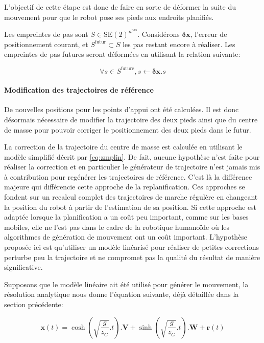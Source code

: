 L'objectif de cette étape est donc de faire en sorte de déformer la
suite du mouvement pour que le robot pose ses pieds aux endroits
planifiés.

Les empreintes de pas sont \mbox{$S \in
  \text{SE}(2)^{n^\text{pas}}$}. Considérons $\mathbf{\delta {x}}$,
l'erreur de positionnement courant, et \mbox{$S^{\text{futur}} \subset
  S$} les pas restant encore à réaliser. Les empreintes de pas futures
seront déformées en utilisant la relation suivante:

\begin{equation}\label{eq:footstepmodif}
  \forall s \in S^{\text{future}}, s \gets \mathbf{\delta {x}} . s
\end{equation}

\paragraph{Modification des trajectoires de référence}

De nouvelles positions pour les points d'appui ont été calculées. Il
est donc désormais nécessaire de modifier la trajectoire des deux
pieds ainsi que du centre de masse pour pouvoir corriger le
positionnement des deux pieds dans le futur.

La correction de la trajectoire du centre de masse est calculée en
utilisant le modèle simplifié décrit par \autoref{eq:zmplin}. De fait,
aucune hypothèse n'est faite pour réaliser la correction et en
particulier le générateur de trajectoire n'est jamais mis à
contribution pour regénérer les trajectoires de référence. C'est là la
différence majeure qui différencie cette approche de la
replanification. Ces approches se fondent sur un recalcul complet des
trajectoires de marche régulère en changeant la position du robot à
partir de l'estimation de sa position. Si cette approche est adaptée
lorsque la planification a un coût peu important, comme sur les bases
mobiles, elle ne l'est pas dans le cadre de la robotique humanoïde où
les algorithmes de génération de mouvement ont un coût
important. L'hypothèse proposée ici est qu'utiliser un modèle
linéarisé pour réaliser de petites corrections perturbe peu la
trajectoire et ne compromet pas la qualité du résultat de manière
significative.


Supposons que le modèle linéaire ait été utilisé pour générer le
mouvement, la résolution analytique nous donne l'équation suivante,
déjà détaillée dans la section précédente:

\begin{equation} \label{eq:zmpsol}
  \mathbf{x}(t) = \cosh(\sqrt{\frac{g}{z_G}}.t) . \mathbf{V} + \sinh(\sqrt{\frac{g}{z_G}}.t) . \mathbf{W} + \mathbf{r}(t)
\end{equation}


